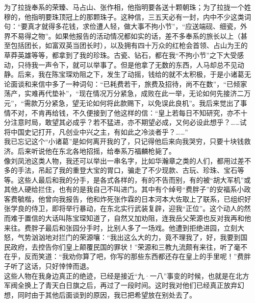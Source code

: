 为了拉拢奉系的荣臻、马占山、张作相，他指明要各送十颗朝珠；为了拉拢一个姓穆的，他指明要珠顶冠上的那颗珠子。这种信，三五天必有一封，内中不少这类词句：“要真才就得多花钱，求俭遭人轻，做大事不拘小节”，“应送端砚、细瓷，外界不易得之物”。如果他报告的活动情况都如实的话，差不多奉系的旅长以上（甚至包括团长，如富双英当团长时），以及拥有四十万众的红枪会首领、占山为王的草莽英雄等等，都拿到了我的珍珠。古瓷、钻石，都在我“不拘小节”之下大受感动，只待我一声令下，就可以举事了。但是他拿了无数的东西，人马却总不见动静。后来，我在陈宝琛劝阻之下，发生了动摇，钱给的就不太积极，于是小诸葛无论面谈和来信中多了一种词句：“已耗费若干，旅费及招待，尚不在数”，“已倾家荡产，实难再代垫补”，“现在情况万分紧急，成败在此一举，无论如何先接济二万元”，“需款万分紧急，望无论如何将此款赐下，以免误此良机”。我后来觉出了事情不对，不肯再给钱，不久便接到了他这样的信：“皇上若每日不知研究，亦不十分注意时局，敢望其必成乎？若不猛进，亦不期望必成，又何必设此想乎？……试将中国史记打开，凡创业中兴之主，有如此之冷淡者乎？……”\\

我已忘记这个“小诸葛”是如何离开我的了，只记得他后来向我哭穷，只要十块钱救济。后来听说他在东北各地招摇，给奉系万福麟枪毙了。\\

像刘凤池这类人物，我还可以举出一串名字，比如华瀚章之类的人们，都用过差不多的手法，吊起了我的重登大宝的胃口，骗走了不少现款、古玩、珍珠、宝石等等。这些人最后和我的分手，是各式各样的，有的不告而别，有的被“胡大军机”或其他人硬给拦住，也有的是我自己不叫进门。其中有个绰号“费胖子”的安福系小政客费毓楷，他曾向我报告，他和炸死张作霖的日本河本大佐取上了联系，已组织好张学良的侍卫，即将举行暴动，在东北实行武装复辟，迎我“正位”。这个动人的然而难于置信的大话叫陈宝琛知道了，自然又加劝阻，连我岳父荣源也反对我再和他来往。费胖子最后和张园分手时，比别人多了一场戏。他遭到拒绝进园，立刻大怒，气势汹汹地对拦门的荣源嚷：“我出这么大的力，竟不理我了，好，我要到国民政府，去控告你们皇上颠覆民国的罪状！”荣源和三教九流颇有来往，听了毫不在乎，反而笑道：“我劝你算了吧，你写的那些东西都还存在皇上的手里呢！”费胖子听了这话，只好悻悻而退。\\

这些人物在我身边真正的绝迹，已经是接近“九·一八”事变的时候，也就是在北方军阀全换上了青天白日旗之后，再过了一段时间。这时我对他们已经真正放弃幻想，同时由于其他后面谈到的原因，我已把希望放在别处去了。\\